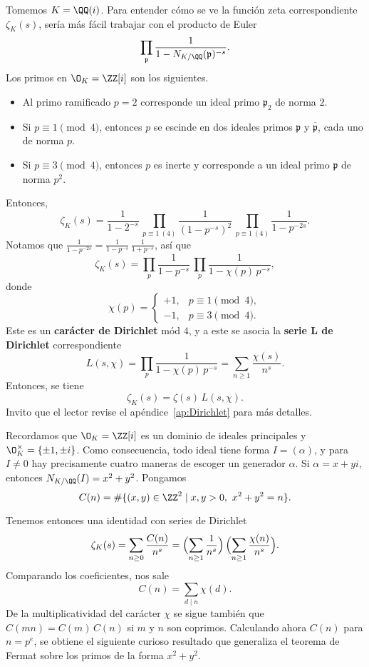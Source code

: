 Tomemos $K = \QQ (i)$. Para entender cómo se ve la función zeta correspondiente
$\zeta_K (s)$, sería más fácil trabajar con el producto de Euler
$$\prod_{\mathfrak{p}} \frac{1}{1 - N_{K/\QQ} (\mathfrak{p})^{-s}}.$$
Los primos en $\O_K = \ZZ[i]$ son los siguientes.
\begin{itemize}
\item Al primo ramificado $p = 2$ corresponde un ideal primo $\mathfrak{p}_2$
  de norma $2$.

\item Si $p \equiv 1 \pmod{4}$, entonces $p$ se escinde en dos ideales primos
  $\mathfrak{p}$ y $\overline{\mathfrak{p}}$, cada uno de norma $p$.

\item Si $p \equiv 3 \pmod{4}$, entonces $p$ es inerte y corresponde a un ideal
  primo $\mathfrak{p}$ de norma $p^2$.
\end{itemize}

Entonces,
\[ \zeta_K (s) =
   \frac{1}{1 - 2^{-s}} \,
   \prod_{p \equiv 1 ~ (4)} \frac{1}{(1 - p^{-s})^2} \,
   \prod_{p \equiv 1 ~ (4)} \frac{1}{1 - p^{-2s}}. \]
Notamos que $\frac{1}{1 - p^{-2s}} = \frac{1}{1 - p^{-s}}\,\frac{1}{1 + p^{-s}}$,
así que
$$\zeta_K (s) = \prod_p \frac{1}{1 - p^{-s}}\,\prod_p \frac{1}{1 - \chi(p)\,p^{-s}},$$
donde
\[ \chi(p) = \begin{cases}
  +1, & p \equiv 1 \pmod{4},\\
  -1, & p \equiv 3 \pmod{4}.
\end{cases} \]
Este es un \textbf{carácter de Dirichlet} mód $4$, y a este se asocia la
\textbf{serie L de Dirichlet} correspondiente
\[ L (s,\chi) = \prod_p \frac{1}{1 - \chi(p)\,p^{-s}} =
   \sum_{n\ge 1} \frac{\chi (s)}{n^s}. \]
Entonces, se tiene
$$\zeta_K (s) = \zeta (s) \, L (s,\chi).$$
Invito que el lector revise el apéndice~\ref{ap:Dirichlet} para más detalles.

Recordamos que $\O_K = \ZZ [i]$ es un dominio de ideales principales y
$\O_K^\times = \{ \pm 1, \pm i \}$. Como consecuencia, todo ideal tiene forma
$I = (\alpha)$, y para $I \ne 0$ hay precisamente cuatro maneras de escoger un
generador $\alpha$. Si $\alpha = x + yi$, entonces $N_{K/\QQ} (I) = x^2 + y^2$.
Pongamos
$$C (n) = \# \{ (x,y) \in \ZZ^2 \mid x,y > 0, ~ x^2 + y^2 = n \}.$$

Tenemos entonces una identidad con series de Dirichlet
\[ \zeta_K (s) = \sum_{n\ge 0} \frac{C (n)}{n^s} =
\Bigl(\sum_{n\ge 1} \frac{1}{n^s}\Bigr)\,\Bigl(\sum_{n\ge 1} \frac{\chi (n)}{n^s}\Bigr). \]
Comparando los coeficientes, nos sale
$$C (n) = \sum_{d \mid n} \chi (d).$$
De la multiplicatividad del carácter $\chi$ se sigue también que
$C (mn) = C (m)\,C (n)$ si $m$ y $n$ son coprimos. Calculando ahora $C (n)$ para
$n = p^e$, se obtiene el siguiente curioso resultado que generaliza el teorema
de Fermat sobre los primos de la forma $x^2 + y^2$.

